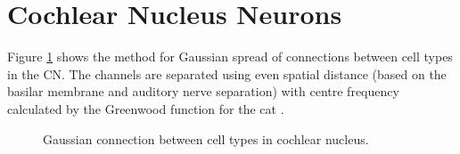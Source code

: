 \section{Cochlear Nucleus Neurons}

Figure \ref{fig:CNconn} shows the method for Gaussian spread of
connections between cell types in the CN.  The channels are separated
using even spatial distance (based on the basilar membrane and
auditory nerve separation) with centre frequency calculated by the
Greenwood function for the cat \citep{Greenwood:1990}.


\begin{figure}[tbh]
  \begin{center}
    \caption{Gaussian connection between cell types in cochlear
      nucleus. }
    \label{fig:CNconn}
  \end{center}
\end{figure}






